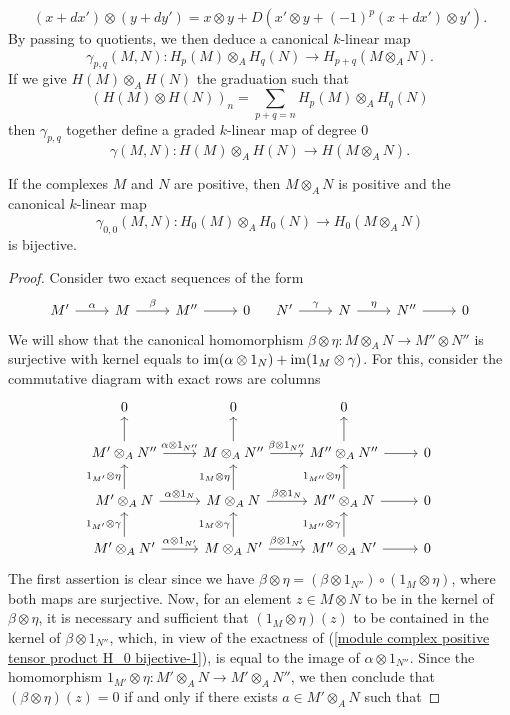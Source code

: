 \[(x+dx')\otimes(y+dy')=x\otimes y+D(x'\otimes y+(-1)^p(x+dx')\otimes y').\]
By passing to quotients, we then deduce a canonical $k$-linear map
\[\gamma_{p,q}(M,N):H_p(M)\otimes_AH_q(N)\to H_{p+q}(M\otimes_AN).\]
If we give $H(M)\otimes_AH(N)$ the graduation such that
\[(H(M)\otimes H(N))_n=\sum_{p+q=n}H_p(M)\otimes_AH_q(N)\]
then $\gamma_{p,q}$ together define a graded $k$-linear map of degree $0$
\[\gamma(M,N):H(M)\otimes_AH(N)\to H(M\otimes_AN).\]
\begin{proposition}\label{module complex positive tensor product H_0 bijective}
If the complexes $M$ and $N$ are positive, then $M\otimes_AN$ is positive and the canonical $k$-linear map
\[\gamma_{0,0}(M,N):H_0(M)\otimes_AH_0(N)\to H_0(M\otimes_AN)\]
is bijective.
\end{proposition}
\begin{proof}
Consider two exact sequences of the form
\[\begin{tikzcd}
M'\ar[r,"\alpha"]&M\ar[r,"\beta"]&M''\ar[r]&0
\end{tikzcd}\quad \begin{tikzcd}
N'\ar[r,"\gamma"]&N\ar[r,"\eta"]&N''\ar[r]&0
\end{tikzcd}\]
We will show that the canonical homomorphism $\beta\otimes\eta:M\otimes_AN\to M''\otimes N''$ is surjective with kernel equals to $\operatorname{im}(\alpha\otimes 1_N)+\operatorname{im}(1_M\otimes\gamma)$. For this, consider the commutative diagram with exact rows are columns
\begin{equation}\label{module complex positive tensor product H_0 bijective-1}
\begin{tikzcd}
0&0&0&\\
M'\otimes_AN''\ar[u]\ar[r,"\alpha\otimes 1_{N''}"]&M\otimes_AN''\ar[u]\ar[r,"\beta\otimes 1_{N''}"]&M''\otimes_AN''\ar[u]\ar[r]&0\\
M'\otimes_AN\ar[u,"1_{M'}\otimes\eta"]\ar[r,"\alpha\otimes 1_{N}"]&M\otimes_AN\ar[u,"1_{M}\otimes\eta"]\ar[r,"\beta\otimes 1_{N}"]&M''\otimes_AN\ar[u,"1_{M''}\otimes\eta"]\ar[r]&0\\
M'\otimes_AN'\ar[u,"1_{M'}\otimes\gamma"]\ar[r,"\alpha\otimes 1_{N'}"]&M\otimes_AN'\ar[u,"1_{M}\otimes\gamma"]\ar[r,"\beta\otimes 1_{N'}"]&M''\otimes_AN'\ar[u,"1_{M''}\otimes\gamma"]\ar[r]&0
\end{tikzcd}
\end{equation}
The first assertion is clear since we have $\beta\otimes\eta=(\beta\otimes 1_{N''})\circ(1_{M}\otimes\eta)$, where both maps are surjective. Now, for an element $z\in M\otimes N$ to be in the kernel of $\beta\otimes\eta$, it is necessary and sufficient that $(1_{M}\otimes\eta)(z)$ to be contained in the kernel of $\beta\otimes 1_{N''}$, which, in view of the exactness of (\ref{module complex positive tensor product H_0 bijective-1}), is equal to the image of $\alpha\otimes 1_{N''}$. Since the homomorphism $1_{M'}\otimes\eta:M'\otimes_AN\to M'\otimes_AN''$, we then conclude that $(\beta\otimes\eta)(z)=0$ if and only if there exists $a\in M'\otimes_AN$ such that

\end{proof}
